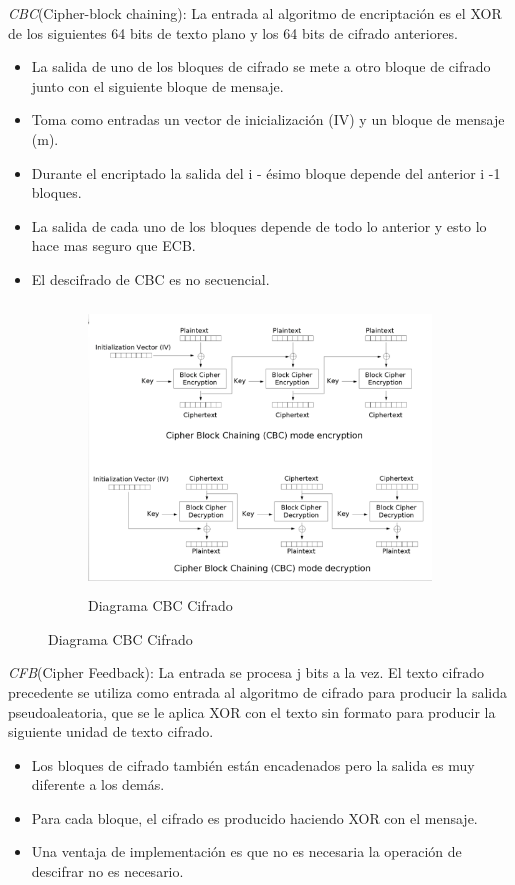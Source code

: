 \textit{CBC}(Cipher-block chaining): La entrada al algoritmo de encriptación es el XOR de los siguientes 64 bits de texto plano y los 64 bits de cifrado anteriores.\\
\begin{itemize}
	\item La salida de uno de los bloques de cifrado se mete a otro bloque de cifrado junto con el siguiente bloque de mensaje.
	\item Toma como entradas un vector de inicialización (IV) y un bloque de mensaje (m).
	\item Durante el encriptado la salida del i - ésimo bloque depende del anterior i -1 bloques.
	\item La salida de cada uno de los bloques depende de todo lo anterior y esto lo hace mas seguro que ECB.
	\item  El descifrado de CBC es no secuencial.
\end{itemize}

\begin{figure}[h]
    \centering
    \begin{subfigure}[t]{0.5\textwidth}
        \centering
        \includegraphics[height=3in]{./images/CBC.png}
        \caption{Diagrama CBC Cifrado}
        \label{fig:1-3-1}
    \end{subfigure}
\end{figure}
\pagebreak

\textit{CFB}(Cipher Feedback): La entrada se procesa j bits a la vez. El texto cifrado precedente se utiliza como entrada al algoritmo de cifrado para producir la salida pseudoaleatoria, que se le aplica XOR con el texto sin formato para producir la siguiente unidad de texto cifrado.\\
\begin{itemize}
	\item Los bloques de cifrado también están encadenados pero la salida es muy diferente a los demás.
	\item Para cada bloque, el cifrado es producido haciendo XOR con el mensaje.
	\item Una ventaja de implementación es que no es necesaria la operación de descifrar no es necesario.
\end{itemize}

